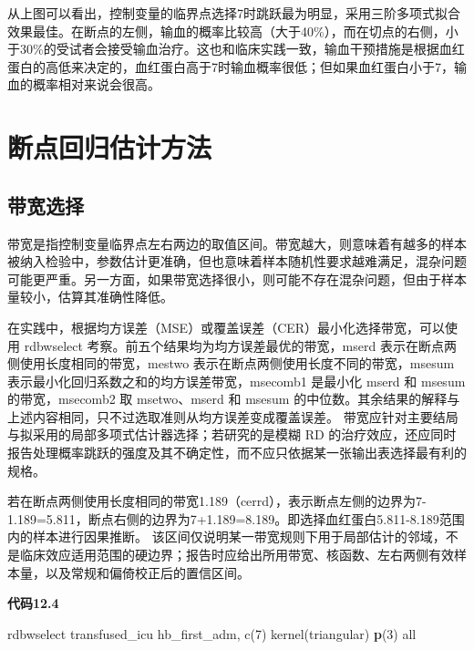 \documentclass[
  chinese-hans,
  letterpaper,
  DIV=11,
  numbers=noendperiod]{scrreprt}
\newenvironment{Shaded}{\begin{snugshade}}{\end{snugshade}}
\newcommand{\KeywordTok}[1]{\textcolor[rgb]{0.00,0.23,0.31}{\textbf{#1}}}
\newcommand{\NormalTok}[1]{\textcolor[rgb]{0.00,0.23,0.31}{#1}}
\newcommand{\OtherTok}[1]{\textcolor[rgb]{0.00,0.23,0.31}{#1}}
\begin{document}
从上图可以看出，控制变量的临界点选择7时跳跃最为明显，采用三阶多项式拟合效果最佳。在断点的左侧，输血的概率比较高（大于40\%），而在切点的右侧，小于30\%的受试者会接受输血治疗。这也和临床实践一致，输血干预措施是根据血红蛋白的高低来决定的，血红蛋白高于7时输血概率很低；但如果血红蛋白小于7，输血的概率相对来说会很高。

\section{断点回归估计方法}\label{ux65adux70b9ux56deux5f52ux4f30ux8ba1ux65b9ux6cd5}

\subsection{带宽选择}\label{ux5e26ux5bbdux9009ux62e9}

带宽是指控制变量临界点左右两边的取值区间。带宽越大，则意味着有越多的样本被纳入检验中，参数估计更准确，但也意味着样本随机性要求越难满足，混杂问题可能更严重。另一方面，如果带宽选择很小，则可能不存在混杂问题，但由于样本量较小，估算其准确性降低。

在实践中，根据均方误差（MSE）或覆盖误差（CER）最小化选择带宽，可以使用
rdbwselect 考察。前五个结果均为均方误差最优的带宽，mserd
表示在断点两侧使用长度相同的带宽，mestwo
表示在断点两侧使用长度不同的带宽，msesum
表示最小化回归系数之和的均方误差带宽，msecomb1 是最小化 mserd 和 msesum
的带宽，msecomb2 取 msetwo、mserd 和 msesum
的中位数。其余结果的解释与上述内容相同，只不过选取准则从均方误差变成覆盖误差。
带宽应针对主要结局与拟采用的局部多项式估计器选择；若研究的是模糊 RD
的治疗效应，还应同时报告处理概率跳跃的强度及其不确定性，而不应只依据某一张输出表选择最有利的规格。

若在断点两侧使用长度相同的带宽1.189（cerrd），表示断点左侧的边界为7-1.189=5.811，断点右侧的边界为7+1.189=8.189。即选择血红蛋白5.811-8.189范围内的样本进行因果推断。
该区间仅说明某一带宽规则下用于局部估计的邻域，不是临床效应适用范围的硬边界；报告时应给出所用带宽、核函数、左右两侧有效样本量，以及常规和偏倚校正后的置信区间。

\begin{tcolorbox}[enhanced jigsaw, arc=.35mm, bottomrule=.15mm, breakable, colback=white, colframe=quarto-callout-note-color-frame, left=2mm, leftrule=.75mm, opacityback=0, rightrule=.15mm, toprule=.15mm]

\vspace{-3mm}\textbf{代码12.4}\vspace{3mm}

\begin{Shaded}
\begin{Highlighting}[]
\NormalTok{rdbwselect transfused\_icu hb\_first\_adm, c(7) kernel(triangular) }\KeywordTok{p}\NormalTok{(3) }\OtherTok{all}
\end{Highlighting}
\end{Shaded}

\end{tcolorbox}
\end{document}
